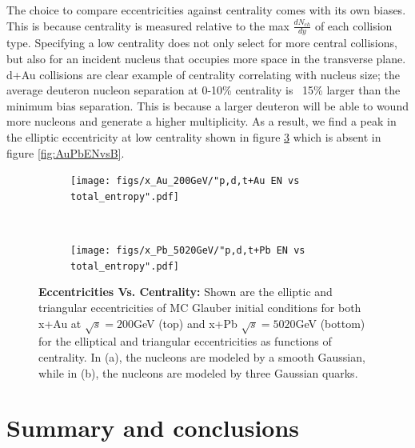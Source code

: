 \documentclass[twocolumn,showpacs,amsfonts,aps,prc,nofootinbib,floatfix]{revtex4}
\begin{document}
The choice to compare eccentricities against centrality comes with its own biases. This is because centrality is measured relative to the max $\frac{dN_{ch}}{dy}$ of each collision type. Specifying a low centrality does not only select for more central collisions, but also for an incident nucleus that occupies more space in the transverse plane. d+Au collisions are clear example of centrality correlating with nucleus size; the average deuteron nucleon separation at 0-10\% centrality is ~15\% larger than the minimum bias separation. This is because a larger deuteron will be able to wound more nucleons and generate a higher multiplicity. As a result, we find a peak in the elliptic eccentricity at low centrality shown in figure \ref{fig:AuPbENvsCent} which is absent in figure \ref{fig:AuPbENvsB}.
\begin{figure}[ht]
	\begin{subfigure}{0.8\linewidth}
		\centering
		\texttt{[image: figs/x\_Au\_200GeV/"p,d,t+Au EN vs total\_entropy".pdf]}
		\label{subfig:AuENvsCent}
	\end{subfigure}\\
	\begin{subfigure}{0.8\linewidth}
		\texttt{[image: figs/x\_Pb\_5020GeV/"p,d,t+Pb EN vs total\_entropy".pdf]}
		\label{subfig:PbENvsCent}
	\end{subfigure}
	\caption{\textbf{Eccentricities Vs. Centrality:} Shown are the elliptic and triangular eccentricities of MC Glauber initial conditions for both x+Au at $\sqrt{s}=200$GeV (top) and x+Pb $\sqrt{s}=5020$GeV (bottom) for the elliptical and triangular eccentricities as functions of centrality. In (a), the nucleons are modeled by a smooth Gaussian, while in (b), the nucleons are modeled by three Gaussian quarks.}
	\label{fig:AuPbENvsCent}
\end{figure}

\section{Summary and conclusions}
\label{sec5}


\end{document}
